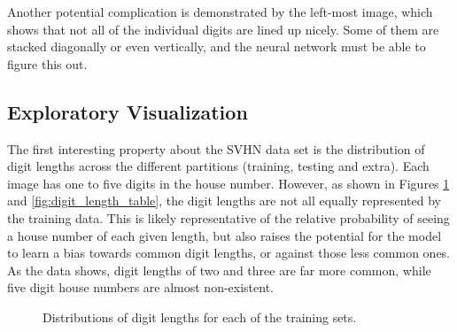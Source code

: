 \documentclass[12pt]{article}
\begin{document}
Another potential complication is demonstrated by the left-most image, which shows that not all of the individual digits are lined up nicely.
Some of them are stacked diagonally or even vertically, and the neural network must be able to figure this out. 

\subsection{Exploratory Visualization}
The first interesting property about the SVHN data set is the distribution of digit lengths across the different partitions (training, testing and extra).
Each image has one to five digits in the house number.
However, as shown in Figures \ref{fig:digit_length_plots} and \ref{fig:digit_length_table}, the digit lengths are not all equally represented by the training data.
This is likely representative of the relative probability of seeing a house number of each given length, but also raises the potential for the model to learn a bias towards common digit lengths, or against those less common ones.
As the data shows, digit lengths of two and three are far more common, while five digit house numbers are almost non-existent.

\begin{figure}[!htb]
\centering
{}\hfill
{}\hfill
{}\hfill
\caption{Distributions of digit lengths for each of the training sets.}
\label{fig:digit_length_plots}
\end{figure}
\end{document}

